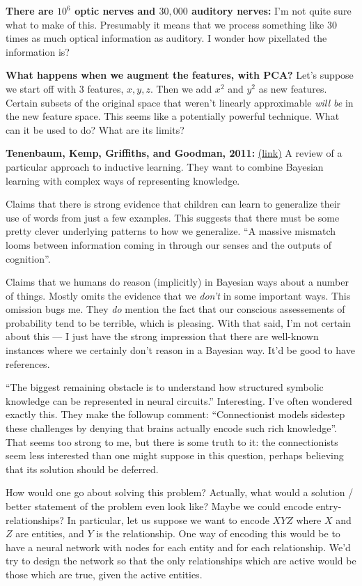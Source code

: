 \documentclass[12pt]{article}
\newcommand{\link}[2]{\href{#1}{#2}}
\begin{document}
\textbf{There are $10^6$ optic nerves and $30,000$ auditory nerves:}
I'm not quite sure what to make of this.  Presumably it means that we
process something like $30$ times as much optical information as
auditory.  I wonder how pixellated the information is?  

\textbf{What happens when we augment the features, with PCA?}  Let's
suppose we start off with 3 features, $x, y, z$.  Then we add $x^2$
and $y^2$ as new features.  Certain subsets of the original space that
weren't linearly approximable \emph{will be} in the new feature space.
This seems like a potentially powerful technique.  What can it be used
to do?  What are its limits?

\textbf{Tenenbaum, Kemp, Griffiths, and Goodman, 2011:}
\link{http://scholar.google.ca/scholar?cluster=2667398573353002097&hl=en&as_sdt=0,5}{(link)}
A review of a particular approach to inductive learning.  They want to
combine Bayesian learning with complex ways of representing knowledge.

Claims that there is strong evidence that children can learn to
generalize their use of words from just a few examples.  This suggests
that there must be some pretty clever underlying patterns to how we
generalize.  ``A massive mismatch looms between information coming in
through our senses and the outputs of cognition''.  

Claims that we humans do reason (implicitly) in Bayesian ways about a
number of things.  Mostly omits the evidence that we \emph{don't} in
some important ways.  This omission bugs me.  They \emph{do} mention
the fact that our conscious assessements of probability tend to be
terrible, which is pleasing.  With that said, I'm not certain about
this --- I just have the strong impression that there are well-known
instances where we certainly don't reason in a Bayesian way.  It'd be
good to have references.

``The biggest remaining obstacle is to understand how structured
symbolic knowledge can be represented in neural circuits.''
Interesting.  I've often wondered exactly this.  They make the
followup comment: ``Connectionist models sidestep these challenges by
denying that brains actually encode such rich knowledge''.  That seems
too strong to me, but there is some truth to it: the connectionists
seem less interested than one might suppose in this question, perhaps
believing that its solution should be deferred.

How would one go about solving this problem?  Actually, what would a
solution / better statement of the problem even look like?  Maybe we
could encode entry-relationships?  In particular, let us suppose we
want to encode $X Y Z$ where $X$ and $Z$ are entities, and $Y$ is the
relationship.  One way of encoding this would be to have a neural
network with nodes for each entity and for each relationship.  We'd
try to design the network so that the only relationships which are
active would be those which are true, given the active entities.
\end{document}
